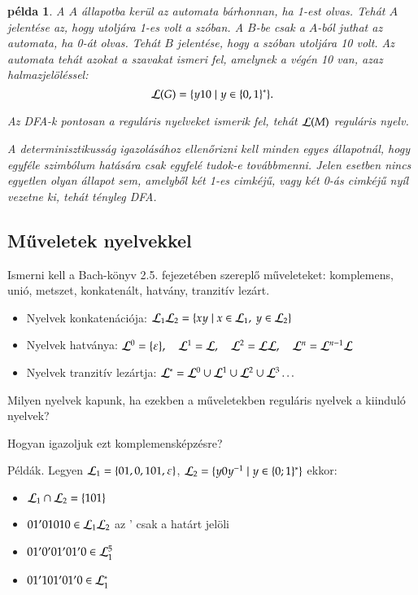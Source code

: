 \documentclass[a4paper]{article}
\newtheorem{pelda}{példa}[section]
\begin{document}
\begin{pelda}
A $A$ állapotba kerül az automata bárhonnan, ha 1-est olvas. Tehát $A$
jelentése az, hogy utoljára 1-es volt a szóban. A $B$-be csak a
$A$-ból juthat az automata, ha 0-át olvas. Tehát $B$ jelentése, hogy
a szóban utoljára 10 volt. Az automata tehát azokat a szavakat ismeri
fel, amelynek a végén 10 van, azaz halmazjelöléssel:
\[{\cal L}(G) = \{y10 \mid y \in \{0,1\}^*\}.\]

Az DFA-k pontosan a reguláris nyelveket ismerik fel, tehát ${\cal L}
(M)$ reguláris nyelv.

A determinisztikusság igazolásához ellenőrizni kell minden egyes
állapotnál, hogy egyféle szimbólum hatására csak egyfelé tudok-e
továbbmenni. Jelen esetben nincs egyetlen olyan állapot sem, amelyből
két 1-es cimkéjű, vagy két 0-ás cimkéjű nyíl vezetne ki, tehát tényleg
DFA.
\end{pelda}


\subsection{Műveletek nyelvekkel}

Ismerni kell a Bach-könyv 2.5. fejezetében szereplő műveleteket:
komplemens, unió, metszet, konkatenált, hatvány, tranzitív lezárt.

\begin{itemize}
    \item Nyelvek konkatenációja: ${\cal L}_1{\cal L}_2 =
        \{xy \mid x \in {\cal L}_1,\: y \in {\cal L}_2\}$
    \item Nyelvek hatványa:  ${\cal L}^0=\{\varepsilon\},\quad
        {\cal L}^1={\cal L},\quad
        {\cal L}^2= {\cal L}{\cal L},\quad
        {\cal L}^n={\cal L}^{n-1}{\cal L}$ 
    \item Nyelvek tranzitív lezártja:  ${\cal L}^*={\cal L}^0 \cup{\cal
        L}^1 \cup{\cal L}^2 \cup{\cal L}^3 \dots$ 
\end{itemize}

Milyen nyelvek kapunk, ha ezekben a műveletekben reguláris nyelvek a
kiinduló nyelvek?

Hogyan igazoljuk ezt komplemensképzésre?

Példák. Legyen
${\cal L}_1 = \{01, 0, 101, \varepsilon \}$,\quad
      ${\cal L}_2 = \{y0y^{-1} \mid y\in \{0; 1\}^*\}$
      ekkor:
\begin{itemize}
\item ${\cal L}_1 \cap {\cal L}_2 = \{101\}$
\item $01'01010 \in {\cal L}_1{\cal L}_2$ \quad az ' csak a határt jelöli
\item $01'0'01'01'0 \in {\cal L}_1^5$
\item $01'101'01'0 \in {\cal L}_1^*$
\end{itemize}
\end{document}
